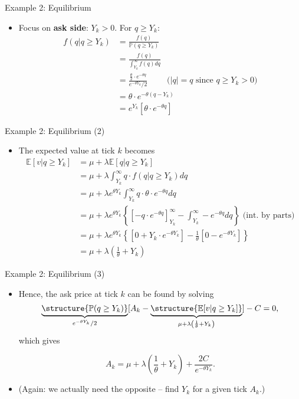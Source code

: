 \documentclass[english,10pt
,aspectratio=169
]{beamer}
\begin{document}
\begin{frame}{Example 2: Equilibrium}
	\begin{itemize}
		\item Focus on \textbf{ask side}: $Y_k>0$. For $q \geq Y_{k}$:
		\begin{align*}
			f(q|q \ge Y_k)&=\frac{f(q)}{ \mathbb{P}(q \geq Y_{k})} \\
			&= \frac{f(q)}{\int^\infty_{Y_k} f(q) dq}\\
			&= \frac{\frac{\theta}{2} \cdot e^{-\theta q}}{e^{-\theta Y_{k}}/2} \quad \quad \text{ ($|q|=q$ since $q \ge Y_k>0$)}\\
			& =\theta \cdot e^{-\theta(q-Y_{k})}\\
			& = e^{Y_k} \left[ \theta \cdot e^{-\theta q} \right]
		\end{align*}
	\end{itemize}
\end{frame}


\begin{frame}{Example 2: Equilibrium (2)}
	\begin{itemize}
		\item The expected value at tick $k$ becomes
		\begin{align*}
		\mathbb{E}[v|q \geq Y_{k}] & =  \mu + \lambda \mathbb{E}[q|q \geq Y_{k}]\\
		&=\mu+ \lambda \int^\infty_{Y_k} q \cdot f(q|q \geq Y_{k}) dq\\
		&=\mu+ \lambda e^{\theta Y_{k}} \int^\infty_{Y_k} q \cdot \theta \cdot e^{-\theta q} dq\\
		& =  \mu+ \lambda e^{\theta Y_{k}} \left\{\left[- q \cdot e^{-\theta q} \right]^\infty_{Y_k} -\int^\infty_{Y_k} -e^{-\theta q} dq   \right\}\text{ (int. by parts)} \\
		& =  \mu+ \lambda e^{\theta Y_{k}} \left\{\left[0+ Y_k \cdot  e^{-\theta Y_k} \right] -\frac{1}{\theta}[0-e^{-\theta Y_k}]   \right\} \\
		& = \mu + \lambda \left( \frac{1}{\theta }+ Y_{k} \right)
		\end{align*}
	\end{itemize}
\end{frame}


\begin{frame}{Example 2: Equilibrium (3)}
	\begin{itemize}
		\item Hence, the ask price at tick $k$ can be found by solving
		\[
		\underbrace{\structure{\mathbb{P}(q \geq Y_k)}}_{e^{-\theta Y_{k}}/2}[A_k-\underbrace{\structure{\mathbb{E}[v|q \geq Y_k]}}_{\mu + \lambda \left( \frac{1}{\theta }+ Y_{k} \right)}] - C = 0,
		\]
		which gives
		\begin{block}{}
			\[
			A_k=\mu + \lambda \left( \frac{1}{\theta }+ Y_{k}\right) + \frac{2C}{e^{-\theta Y_{k}}}.
			\]
		\end{block}
		\item (Again: we actually need the opposite -- find $Y_k$ for a given tick $A_k$.)
	\end{itemize}
\end{frame}
\end{document}
